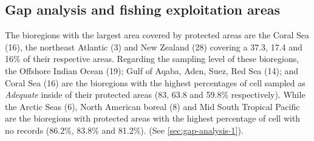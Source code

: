 \documentclass[12pt,authoryear]{elsarticle}
\begin{document}
\subsection{Gap analysis and fishing exploitation areas}
\label{sec:GAP}

The bioregions with the largest area covered by protected areas are the Coral Sea (16), the northeast Atlantic (3) and New Zealand (28) covering a 37.3, 17.4 and 16\% of their respective areas.
Regarding the sampling level of these bioregions, the Offshore Indian Ocean (19); Gulf of Aqaba, Aden, Suez, Red Sea (14); and Coral Sea (16) are the bioregions with the highest percentages of cell sampled as \textit{Adequate}
inside of their protected areas (83, 63.8 and 59.8\% respectively).
While the Arctic Seas (6), North American boreal (8) and Mid South Tropical Pacific are the bioregions with protected areas with the highest percentage of cell with no records (86.2\%, 83.8\% and 81.2\%).
(See \ref{sec:gap-analysis-1}).
\end{document}
